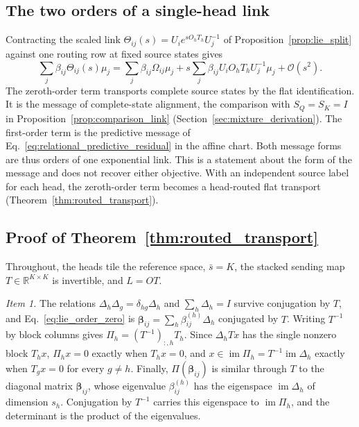 \documentclass[twoside,11pt]{article}
\begin{document}
\subsection{The two orders of a single-head link}
\label{app:proof_two_orders}

Contracting the scaled link $\Theta_{ij}(s)=U_ie^{sO_hT_h}U_j^{-1}$ of Proposition~\ref{prop:lie_split} against one routing row at fixed source states gives
\begin{equation}
\sum_j\beta_{ij}\Theta_{ij}(s)\mu_j
=\sum_j\beta_{ij}\Omega_{ij}\mu_j
+s\sum_j\beta_{ij}U_iO_hT_hU_j^{-1}\mu_j+\mathcal O(s^2).
\label{eq:lie_two_orders}
\end{equation}
The zeroth-order term transports complete source states by the flat identification. It is the message of complete-state alignment, the comparison with $S_Q=S_K=I$ in Proposition~\ref{prop:comparison_link} (Section~\ref{sec:mixture_derivation}). The first-order term is the predictive message of Eq.~\eqref{eq:relational_predictive_residual} in the affine chart. Both message forms are thus orders of one exponential link. This is a statement about the form of the message and does not recover either objective. With an independent source label for each head, the zeroth-order term becomes a head-routed flat transport (Theorem~\ref{thm:routed_transport}).

\subsection{Proof of Theorem~\ref{thm:routed_transport}}
\label{app:proof_routed_transport}

Throughout, the heads tile the reference space, $\bar s=K$, the stacked sending map $T\in\mathbb R^{K\times K}$ is invertible, and $L=OT$.

\emph{Item 1.} The relations $\Delta_h\Delta_g=\delta_{hg}\Delta_h$ and $\sum_h\Delta_h=I$ survive conjugation by $T$, and Eq.~\eqref{eq:lie_order_zero} is $\boldsymbol\beta_{ij}=\sum_h\beta_{ij}^{(h)}\Delta_h$ conjugated by $T$. Writing $T^{-1}$ by block columns gives $\Pi_h=(T^{-1})_{:,h}T_h$. Since $\Delta_hTx$ has the single nonzero block $T_hx$, $\Pi_hx=0$ exactly when $T_hx=0$, and $x\in\operatorname{im}\Pi_h=T^{-1}\operatorname{im}\Delta_h$ exactly when $T_gx=0$ for every $g\ne h$. Finally, $\Pi(\boldsymbol\beta_{ij})$ is similar through $T$ to the diagonal matrix $\boldsymbol\beta_{ij}$, whose eigenvalue $\beta_{ij}^{(h)}$ has the eigenspace $\operatorname{im}\Delta_h$ of dimension $s_h$. Conjugation by $T^{-1}$ carries this eigenspace to $\operatorname{im}\Pi_h$, and the determinant is the product of the eigenvalues.
\end{document}

